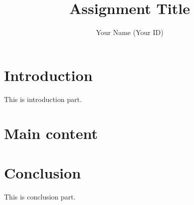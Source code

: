 \documentclass[a4paper,12pt]{article}
\begin{document}
\title{Assignment Title}
\author{Your Name (Your ID)}
\maketitle

\tableofcontents

\section{Introduction}
This is introduction part.

\section{Main content}


\section{Conclusion}
This is conclusion part.
\end{document}

